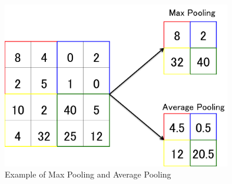 \begin{figure}[H]

	\begin{center}
	\includegraphics[width=10cm]{picture/Pooling.png}
	\caption{Example of Max Pooling and Average Pooling}
	\end{center}
	\label{fig:seven}

\end{figure}

 




